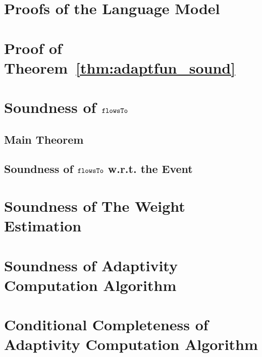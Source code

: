 \section{Proofs of the Language Model}
\label{apdx:lemma_sec123}

\section{Proof of Theorem~\ref{thm:adaptfun_sound}}
\label{apdx:adapt_soundness}

\clearpage
\section{Soundness of $\mathtt{flowsTo}$}
\label{apdx:flowsto_soundness}
\subsection{Main Theorem}

%
\subsection{Soundness of $\mathtt{flowsTo}$ w.r.t. the Event}
\label{apdx:flowsto_event_soundness}

\clearpage
\section{Soundness of The Weight Estimation}
\label{apdx:reachability_soundness}

\clearpage
\section{Soundness of Adaptivity Computation Algorithm}
\label{apdx:adaptalg_soundness}

\section{Conditional Completeness of Adaptivity Computation Algorithm}
\label{apdx:adaptalg_completeness}
